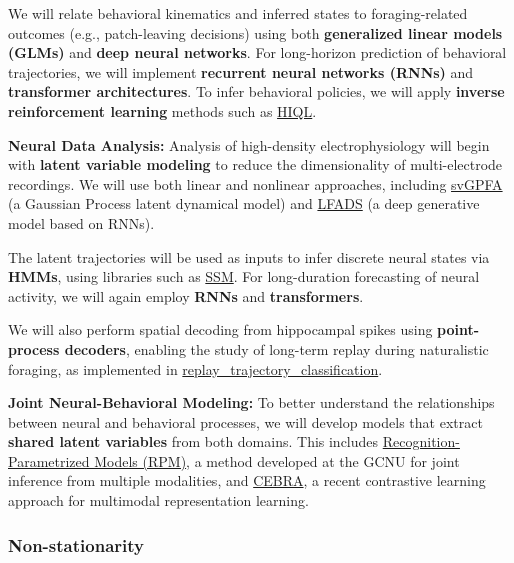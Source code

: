 We will relate behavioral kinematics and inferred states to foraging-related
outcomes (e.g., patch-leaving decisions) using both \textbf{generalized linear
models (GLMs)} and \textbf{deep neural networks}. For long-horizon prediction
of behavioral trajectories, we will implement \textbf{recurrent neural networks
(RNNs)} and \textbf{transformer architectures}. To infer behavioral policies,
we will apply \textbf{inverse reinforcement learning} methods such as
\href{https://github.com/haozhu10015/hiql}{HIQL}.

\vspace{1em}
\noindent\textbf{Neural Data Analysis:}  
Analysis of high-density electrophysiology will begin with \textbf{latent
variable modeling} to reduce the dimensionality of multi-electrode recordings.
We will use both linear and nonlinear approaches, including
\href{https://github.com/joacorapela/svGPFA}{svGPFA} (a Gaussian Process latent
dynamical model) and \href{https://snel.ai/resources/lfads/}{LFADS} (a deep
generative model based on RNNs).

The latent trajectories will be used as inputs to infer discrete neural states
via \textbf{HMMs}, using libraries such as
\href{https://github.com/lindermanlab/ssm}{SSM}. For long-duration forecasting
of neural activity, we will again employ \textbf{RNNs} and
\textbf{transformers}.

We will also perform spatial decoding from hippocampal spikes using
\textbf{point-process decoders}, enabling the study of long-term replay during
naturalistic foraging, as implemented in
\href{https://github.com/Eden-Kramer-Lab/replay_trajectory_classification}{replay\_trajectory\_classification}.

\vspace{1em}
\noindent\textbf{Joint Neural-Behavioral Modeling:}  
To better understand the relationships between neural and behavioral processes,
we will develop models that extract \textbf{shared latent variables} from both
domains. This includes
\href{https://github.com/gatsby-sahani/rpm-aistats-2023}{Recognition-Parametrized
Models (RPM)}, a method developed at the GCNU for joint inference from multiple
modalities, and \href{https://cebra.ai/}{CEBRA}, a recent contrastive learning
approach for multimodal representation learning.

\subsubsection*{Non-stationarity}

